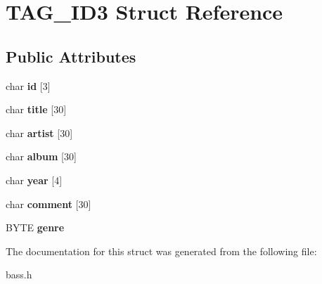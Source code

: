 \hypertarget{structTAG__ID3}{}\section{T\+A\+G\+\_\+\+I\+D3 Struct Reference}
\label{structTAG__ID3}
\subsection*{Public Attributes}
\begin{DoxyCompactItemize}
\item 
\hypertarget{structTAG__ID3_a64073f8c2857123f2aa2b0d55ff55ee1}{}char {\bfseries id} \mbox{[}3\mbox{]}\label{structTAG__ID3_a64073f8c2857123f2aa2b0d55ff55ee1}

\item 
\hypertarget{structTAG__ID3_a9b704897c67d7c9d774dffefc0bdb8a4}{}char {\bfseries title} \mbox{[}30\mbox{]}\label{structTAG__ID3_a9b704897c67d7c9d774dffefc0bdb8a4}

\item 
\hypertarget{structTAG__ID3_ae3c5faab5dae9cdac4776c56ba03fc4a}{}char {\bfseries artist} \mbox{[}30\mbox{]}\label{structTAG__ID3_ae3c5faab5dae9cdac4776c56ba03fc4a}

\item 
\hypertarget{structTAG__ID3_a77cda3af3c4457fd723a6316ea9ec58d}{}char {\bfseries album} \mbox{[}30\mbox{]}\label{structTAG__ID3_a77cda3af3c4457fd723a6316ea9ec58d}

\item 
\hypertarget{structTAG__ID3_aca8533031988d134be6d738b8e09c223}{}char {\bfseries year} \mbox{[}4\mbox{]}\label{structTAG__ID3_aca8533031988d134be6d738b8e09c223}

\item 
\hypertarget{structTAG__ID3_a2a91c7b5288472b8959b51c17320131f}{}char {\bfseries comment} \mbox{[}30\mbox{]}\label{structTAG__ID3_a2a91c7b5288472b8959b51c17320131f}

\item 
\hypertarget{structTAG__ID3_af7a5412ae2d2acafd300dca3212dbbc2}{}B\+Y\+T\+E {\bfseries genre}\label{structTAG__ID3_af7a5412ae2d2acafd300dca3212dbbc2}

\end{DoxyCompactItemize}


The documentation for this struct was generated from the following file\+:\begin{DoxyCompactItemize}
\item 
bass.\+h\end{DoxyCompactItemize}
